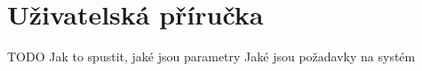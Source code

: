 \section{Uživatelská příručka}

TODO
Jak to spustit, jaké jsou parametry
Jaké jsou požadavky na systém

\clearpage

